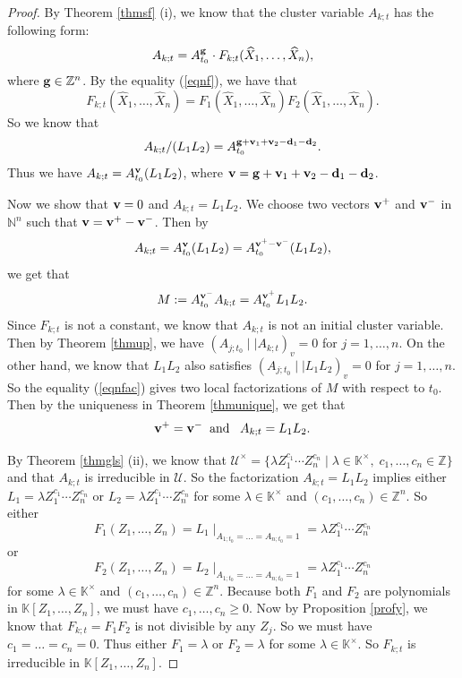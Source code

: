 \documentclass{amsart}
\theoremstyle{definition}
\theoremstyle{remark}
\numberwithin{equation}{section}
\begin{document}
\begin{proof}
By Theorem \ref{thmsf} (i), we know that the cluster variable $A_{k;t}$ has the following form:
 \begin{eqnarray}
A_{k;t}=A_{t_0}^{{\bf g}}\cdot F_{k;t}(\widehat X_1,\ldots,\widehat X_n),\nonumber
\end{eqnarray}
where ${\bf g}\in \mathbb Z^n$.
By the equality (\ref{eqnf}), we have that
$$F_{k;t}(\widehat X_1,\ldots,\widehat X_n)=F_1(\widehat X_1,\ldots,\widehat X_n)F_2(\widehat X_1,\ldots,\widehat X_n).$$
So we know that $$A_{k;t}/(L_1L_2)=A_{t_0}^{{\bf g}+{\bf v}_1+{\bf v}_2-{\bf d}_1-{\bf d}_2}.$$
Thus we have
$A_{k;t}=A_{t_0}^{\bf v}(L_1L_2)$, where ${\bf v}={\bf g}+{\bf v}_1+{\bf v}_2-{\bf d}_1-{\bf d}_2$.

Now we show that ${\bf v}=0$ and $A_{k;t}=L_1L_2$. We choose
two vectors ${\bf v}^+$ and ${\bf v}^-$ in $\mathbb N^n$ such that
${\bf v}={\bf v}^+-{\bf v}^-$. Then by
$$
A_{k;t}=A_{t_0}^{\bf v}(L_1L_2)=A_{t_0}^{{\bf v}^+-{\bf v}^-}(L_1L_2),
$$
we get that
\begin{eqnarray}\label{eqnfac}
M:=A_{t_0}^{{\bf v}^-}A_{k;t}=A_{t_0}^{{\bf v}^+}L_1L_2.
\end{eqnarray}
Since $F_{k;t}$ is not a constant, we know that $A_{k;t}$ is not an initial cluster variable. Then by  Theorem \ref{thmup},
 we have $(A_{j;t_0}\mid\mid A_{k;t})_v=0$ for $j=1,\ldots,n$. On the other hand, we know that $L_1L_2$ also satisfies   $(A_{j;t_0}\mid\mid L_1L_2)_v=0$ for $j=1,\ldots,n$. So the equality (\ref{eqnfac}) gives two local factorizations of $M$ with respect to $t_0$. Then by the uniqueness in Theorem \ref{thmunique}, we get that $${\bf v}^+={\bf v}^-\;\;\text{and}\;\;\;A_{k;t}=L_1L_2.$$


By Theorem \ref{thmgls} (ii), we know that $\mathcal U^\times=\{\lambda Z_1^{c_1}\cdots Z_n^{c_n}\mid \lambda\in\mathbb K^\times,\;c_1,\ldots,c_n\in \mathbb Z\}$ and that $A_{k;t}$ is irreducible in $\mathcal U$. So the factorization $A_{k;t}=L_1L_2$ implies either $L_1=\lambda Z_1^{c_1}\cdots Z_n^{c_n}$ or $L_2=\lambda Z_1^{c_1}\cdots Z_n^{c_n}$ for some $\lambda\in\mathbb K^\times$ and $(c_1,\ldots,c_n)\in\mathbb Z^n$.
So either $$F_1(Z_1,\ldots,Z_n)=L_1\mid _{A_{1;t_0}=\ldots=A_{n;t_0}=1}=\lambda Z_1^{c_1}\cdots Z_n^{c_n}$$ or $$F_2(Z_1,\ldots,Z_n)=L_2\mid _{A_{1;t_0}=\ldots=A_{n;t_0}=1}=\lambda Z_1^{c_1}\cdots Z_n^{c_n}$$ for some $\lambda\in\mathbb K^\times$ and $(c_1,\ldots,c_n)\in\mathbb Z^n$. Because both $F_1$ and $F_2$ are polynomials in $\mathbb K[Z_1,\ldots,Z_n]$, we must have $c_1,\ldots,c_n\geq 0$. Now by Proposition \ref{profy}, we know that $F_{k;t}=F_1F_2$ is not divisible by any $Z_j$. So we must have $c_1=\ldots=c_n=0$. Thus either $F_1=\lambda$ or $F_2=\lambda$ for some $\lambda\in\mathbb K^\times$. So $F_{k;t}$ is irreducible in $\mathbb K[Z_1,\ldots,Z_n]$.
\end{proof}
\end{document}
